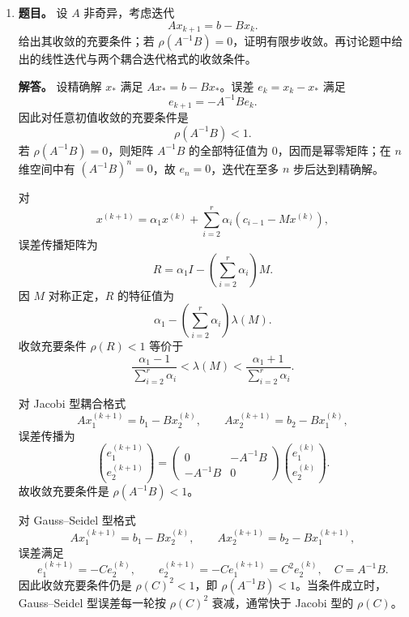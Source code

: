 ﻿\documentclass[UTF8,12pt]{ctexart}
\begin{document}
\begin{enumerate}[label=\textbf{\arabic*.},leftmargin=2.2em]
\textbf{解答。} 先看模型情形
\[
f(x)=c_1\quad(x\le0),\qquad f(x)=c_2\quad(x>0),
\qquad c_1\ne c_2.
\]
将节点写作 \(x_j=x_i+(j-i)h\)，并令 \(x=x_i+sh\)，\(0\le s\le1\)。插值多项式为
\[
p(x)=c_1+(c_2-c_1)Q(s),
\]
其中 \(Q\) 是只依赖于 \(k\) 与断点位置的固定多项式，它在左侧节点取 \(0\)，右侧节点取 \(1\)。于是
\[
p'(x)=\frac{c_2-c_1}{h}Q'(s).
\]
由插值节点分列断点两侧可知，\(Q\) 在 \([0,1]\) 上严格从 \(0\) 变到 \(1\)，且 \(Q'\) 在该闭区间上不为零；否则 Rolle 定理会给出过多零点，矛盾。因此模型情形下 \(|p'(x)|\ge C/h\)。

一般情形下，写
\[
f_1(x)=f_1(0)+O(h),
\qquad
f_2(x)=f_2(0)+O(h)
\]
在所有相关节点上一致成立。相应插值多项式可分为阶跃函数插值部分加扰动部分。阶跃部分导数为 \(O(1/h)\)，扰动部分导数为 \(O(1)\)。由于 \(f_2(0)-f_1(0)\ne0\)，当 \(h\) 足够小时，主导项不能被扰动抵消，故 \(p'(x)\ne0\) 于 \([x_i,x_{i+1}]\)。所以 \(p\) 在该区间单调。

\item \textbf{题目。} 设 \(A\) 非奇异，考虑迭代
\[
Ax_{k+1}=b-Bx_k.
\]
给出其收敛的充要条件；若 \(\rho(A^{-1}B)=0\)，证明有限步收敛。再讨论题中给出的线性迭代与两个耦合迭代格式的收敛条件。

\textbf{解答。} 设精确解 \(x_*\) 满足 \(Ax_*=b-Bx_*\)。误差 \(e_k=x_k-x_*\) 满足
\[
e_{k+1}=-A^{-1}Be_k.
\]
因此对任意初值收敛的充要条件是
\[
\rho(A^{-1}B)<1.
\]
若 \(\rho(A^{-1}B)=0\)，则矩阵 \(A^{-1}B\) 的全部特征值为 \(0\)，因而是幂零矩阵；在 \(n\) 维空间中有 \((A^{-1}B)^n=0\)，故 \(e_n=0\)，迭代在至多 \(n\) 步后达到精确解。

对
\[
x^{(k+1)}=\alpha_1x^{(k)}+\sum_{i=2}^r\alpha_i(c_{i-1}-Mx^{(k)}),
\]
误差传播矩阵为
\[
R=\alpha_1I-\left(\sum_{i=2}^r\alpha_i\right)M.
\]
因 \(M\) 对称正定，\(R\) 的特征值为
\[
\alpha_1-\left(\sum_{i=2}^r\alpha_i\right)\lambda(M).
\]
收敛充要条件 \(\rho(R)<1\) 等价于
\[
\frac{\alpha_1-1}{\sum_{i=2}^r\alpha_i}
<\lambda(M)<
\frac{\alpha_1+1}{\sum_{i=2}^r\alpha_i}.
\]

对 Jacobi 型耦合格式
\[
Ax_1^{(k+1)}=b_1-Bx_2^{(k)},
\qquad
Ax_2^{(k+1)}=b_2-Bx_1^{(k)},
\]
误差传播为
\[
\binom{e_1^{(k+1)}}{e_2^{(k+1)}}=\begin{pmatrix}0&-A^{-1}B\\-A^{-1}B&0\end{pmatrix}
\binom{e_1^{(k)}}{e_2^{(k)}}.
\]
故收敛充要条件是 \(\rho(A^{-1}B)<1\)。

对 Gauss--Seidel 型格式
\[
Ax_1^{(k+1)}=b_1-Bx_2^{(k)},
\qquad
Ax_2^{(k+1)}=b_2-Bx_1^{(k+1)},
\]
误差满足
\[
e_1^{(k+1)}=-Ce_2^{(k)},
\qquad
e_2^{(k+1)}=-Ce_1^{(k+1)}=C^2e_2^{(k)},
\quad C=A^{-1}B.
\]
因此收敛充要条件仍是 \(\rho(C)^2<1\)，即 \(\rho(A^{-1}B)<1\)。当条件成立时，Gauss--Seidel 型误差每一轮按 \(\rho(C)^2\) 衰减，通常快于 Jacobi 型的 \(\rho(C)\)。


\end{enumerate}
\end{document}
